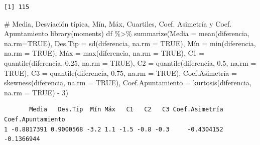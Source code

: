 \documentclass[
  a4paper,
]{scrreport}
\newenvironment{Shaded}{\begin{snugshade}}{\end{snugshade}}
\newcommand{\AttributeTok}[1]{\textcolor[rgb]{0.40,0.45,0.13}{#1}}
\newcommand{\CommentTok}[1]{\textcolor[rgb]{0.37,0.37,0.37}{#1}}
\newcommand{\ConstantTok}[1]{\textcolor[rgb]{0.56,0.35,0.01}{#1}}
\newcommand{\DecValTok}[1]{\textcolor[rgb]{0.68,0.00,0.00}{#1}}
\newcommand{\FloatTok}[1]{\textcolor[rgb]{0.68,0.00,0.00}{#1}}
\newcommand{\FunctionTok}[1]{\textcolor[rgb]{0.28,0.35,0.67}{#1}}
\newcommand{\NormalTok}[1]{\textcolor[rgb]{0.00,0.23,0.31}{#1}}
\newcommand{\OtherTok}[1]{\textcolor[rgb]{0.00,0.23,0.31}{#1}}
\newcommand{\SpecialCharTok}[1]{\textcolor[rgb]{0.37,0.37,0.37}{#1}}
\theoremstyle{definition}
\theoremstyle{definition}
\theoremstyle{remark}
\begin{document}
\begin{Shaded}
\end{Shaded}

\begin{verbatim}
[1] 115
\end{verbatim}

\begin{Shaded}
\begin{Highlighting}[]
\CommentTok{\# Media, Desviación típica, Mín, Máx, Cuartiles, Coef. Asimetría y Coef. Apuntamiento}
\FunctionTok{library}\NormalTok{(moments)}
\NormalTok{df }\SpecialCharTok{\%\textgreater{}\%} \FunctionTok{summarize}\NormalTok{(}\AttributeTok{Media =} \FunctionTok{mean}\NormalTok{(diferencia, }\AttributeTok{na.rm=}\ConstantTok{TRUE}\NormalTok{), }\AttributeTok{Des.Tip =} \FunctionTok{sd}\NormalTok{(diferencia, }\AttributeTok{na.rm =} \ConstantTok{TRUE}\NormalTok{), Mín }\OtherTok{=} \FunctionTok{min}\NormalTok{(diferencia, }\AttributeTok{na.rm =} \ConstantTok{TRUE}\NormalTok{), Máx }\OtherTok{=} \FunctionTok{max}\NormalTok{(diferencia, }\AttributeTok{na.rm =} \ConstantTok{TRUE}\NormalTok{), }\AttributeTok{C1 =} \FunctionTok{quantile}\NormalTok{(diferencia, }\FloatTok{0.25}\NormalTok{, }\AttributeTok{na.rm =} \ConstantTok{TRUE}\NormalTok{), }\AttributeTok{C2 =} \FunctionTok{quantile}\NormalTok{(diferencia, }\FloatTok{0.5}\NormalTok{, }\AttributeTok{na.rm =} \ConstantTok{TRUE}\NormalTok{), }\AttributeTok{C3 =} \FunctionTok{quantile}\NormalTok{(diferencia, }\FloatTok{0.75}\NormalTok{, }\AttributeTok{na.rm =} \ConstantTok{TRUE}\NormalTok{), Coef.Asimetría }\OtherTok{=} \FunctionTok{skewness}\NormalTok{(diferencia, }\AttributeTok{na.rm =} \ConstantTok{TRUE}\NormalTok{), }\AttributeTok{Coef.Apuntamiento =} \FunctionTok{kurtosis}\NormalTok{(diferencia, }\AttributeTok{na.rm =} \ConstantTok{TRUE}\NormalTok{) }\SpecialCharTok{{-}} \DecValTok{3}\NormalTok{)}
\end{Highlighting}
\end{Shaded}

\begin{verbatim}
       Media   Des.Tip  Mín Máx   C1   C2   C3 Coef.Asimetría Coef.Apuntamiento
1 -0.8817391 0.9000568 -3.2 1.1 -1.5 -0.8 -0.3     -0.4304152        -0.1366944
\end{verbatim}
\end{document}
